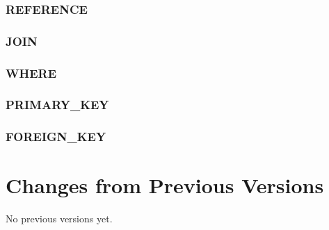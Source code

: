 \documentclass[11pt,a4paper]{ivoa}
\begin{document}
\subsubsection{REFERENCE}

\FloatBarrier

\subsubsection{JOIN}

\FloatBarrier

\subsubsection{WHERE}

\FloatBarrier

\subsubsection{PRIMARY\_KEY}

\FloatBarrier

\subsubsection{FOREIGN\_KEY}

\FloatBarrier

\section{Changes from Previous Versions}

No previous versions yet.  



\end{document}
